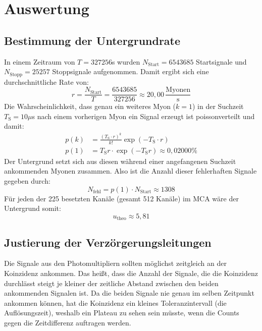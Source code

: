 \section{Auswertung}
    \subsection{Bestimmung der Untergrundrate}
        In einem Zeitraum von $T = 327256$s wurden $N_{\text{Start}} = 6543685$ Startsignale und $N_{\text{Stopp}} = 25257$
        Stoppsignale aufgenommen. Damit ergibt sich eine durchschnittliche Rate von:
        \begin{equation*}
            r = \frac{N_{\text{Start}}}{T} = \frac{6543685}{327256} \approx 20,00 \, \frac{\text{Myonen}}{\text{s}}
        \end{equation*}
        Die Wahrscheinlichkeit, dass genau ein weiteres Myon ($k = 1$) in der Suchzeit $T_\text{S} = 10\mu$s nach einem vorherigen Myon ein Signal erzeugt ist poissonverteilt und damit:
        \begin{align*}
            p(k) &= \frac{(T_{\text{S}} \cdot r)^k}{k!} \exp\left(-T_{\text{S}} \cdot r\right) \\[10pt]
            p(1) &= T_{\text{S}} r \cdot \exp\left(-T_{\text{S}}  r\right) \approx 0,02000 \%
        \end{align*}
        Der Untergrund setzt sich aus diesen während einer angefangenen Suchzeit ankommenden Myonen zusammen. Also ist die Anzahl dieser fehlerhaften Signale gegeben durch:
        \begin{equation*}
            N_{\text{fehl}} = p(1) \cdot N_{\text{Start}} \approx 1308
        \end{equation*}
        Für jeden der 225 besetzten Kanäle (gesamt 512 Kanäle) im MCA wäre der Untergrund somit:
        \begin{equation*}
            u_{\text{theo}} \approx 5,81
        \end{equation*}

    \subsection{Justierung der Verzörgerungsleitungen}
        Die Signale aus den Photomultipliern sollten möglichst zeitgleich an der Koinzidenz ankommen. Das heißt, dass die Anzahl der Signale, die die Koinzidenz durchlässt steigt je kleiner der zeitliche Abstand zwischen den beiden ankommenden Signalen ist. Da die beiden Signale nie genau im selben Zeitpunkt ankommen können, hat die Koinzidenz ein kleines Toleranzintervall (die Auflösungszeit), weshalb ein Plateau zu sehen sein müsste, wenn die Counts gegen die Zeitdifferenz auftragen werden.
        
